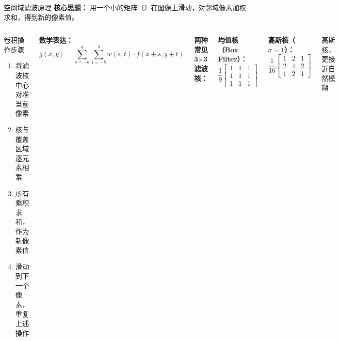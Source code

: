 \begin{frame}{空间域滤波原理}
	\textbf{核心思想：} 用一个小的矩阵（）在图像上滑动，对邻域像素加权求和，得到新的像素值。

	\vspace{0.2cm}

	\begin{columns}
		\begin{block}{卷积操作步骤}
			\begin{enumerate}
				\item 将滤波核中心对准当前像素
				\item 核与覆盖区域逐元素相乘
				\item 所有乘积求和，作为新像素值
				\item 滑动到下一个像素，重复上述操作
			\end{enumerate}
		\end{block}

		\vspace{0.2cm}
		\textbf{数学表达：}
		$$g(x,y) = \sum_{s=-a}^{a}\sum_{t=-b}^{b} w(s,t) \cdot f(x+s, y+t)$$

		\textbf{两种常见3$\times$3滤波核：}

		\vspace{0.2cm}
		\textbf{均值核（Box Filter）：}
		$$\frac{1}{9}\begin{bmatrix} 1 & 1 & 1 \\ 1 & 1 & 1 \\ 1 & 1 & 1 \end{bmatrix}$$

		\vspace{0.2cm}
		\textbf{高斯核（$\sigma=1$）：}
		$$\frac{1}{16}\begin{bmatrix} 1 & 2 & 1 \\ 2 & 4 & 2 \\ 1 & 2 & 1 \end{bmatrix}$$

		\vspace{0.2cm}
		\small 高斯核，更接近自然模糊
	\end{columns}
\end{frame}

